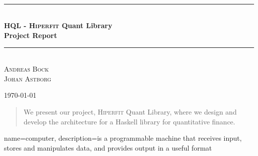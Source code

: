 \documentclass[a4paper,11pt]{scrreprt}
\def\Title{\bf HQL - \textsc{Hiperfit} Quant Library\\ {\Large Project Report}}
\newcommand{\HRule}{\rule{\linewidth}{0.5mm}}
\begin{document}
\begin{titlepage}

\textsc{\LARGE }\\[1.5cm]
\textsc{\Large }\\[0.5cm]
\textsc{\large }\\[0.5cm]
 
\begin{center}
\HRule \\[0.5cm]
\huge \bfseries \Title\\[0.5cm]
\HRule \\[0.5cm]

\Large
\textsc{Andreas Bock \\ Johan Astborg }\\[3cm]


\date{\today}



{\today}\\[4cm]
 
\vfill
\end{center}

\end{titlepage}
\begin{abstract}

We present our project, \textsc{Hiperfit} Quant Library, where we design and develop the architecture for a Haskell library for quantitative finance.

\end{abstract}
\tableofcontents
\listoftables
{}
\listoffigures










{
  name=computer,
    description={is a programmable machine that receives input,
                   stores and manipulates data, and provides
                                  output in a useful format}
}
\end{document}
